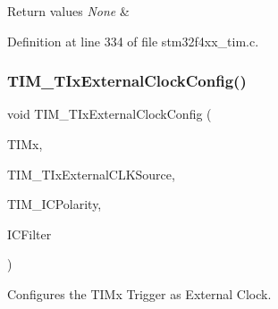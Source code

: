 \begin{DoxyRetVals}{Return values}
{\em None} & \\
\hline
\end{DoxyRetVals}


Definition at line 334 of file stm32f4xx\+\_\+tim.\+c.

\mbox{\label{group___t_i_m_gaf460e7d9c9969044e364130e209937fc}} 
\subsubsection{\texorpdfstring{T\+I\+M\+\_\+\+T\+Ix\+External\+Clock\+Config()}{TIM\_TIxExternalClockConfig()}}
{\footnotesize\ttfamily void T\+I\+M\+\_\+\+T\+Ix\+External\+Clock\+Config (\begin{DoxyParamCaption}\item[{\hyperlink{struct_t_i_m___type_def}{T\+I\+M\+\_\+\+Type\+Def} $\ast$}]{T\+I\+Mx,  }\item[{uint16\+\_\+t}]{T\+I\+M\+\_\+\+T\+Ix\+External\+C\+L\+K\+Source,  }\item[{uint16\+\_\+t}]{T\+I\+M\+\_\+\+I\+C\+Polarity,  }\item[{uint16\+\_\+t}]{I\+C\+Filter }\end{DoxyParamCaption})}



Configures the T\+I\+Mx Trigger as External Clock. 


